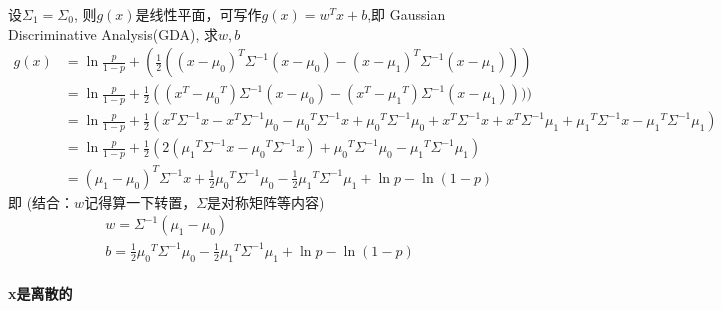 \documentclass[UTF8]{ctexart}
\begin{document}
设$ \Sigma_1=\Sigma_0 $, 则$g(x)$是线性平面，可写作$g(x) = w^Tx+b$,即 Gaussian Discriminative Analysis(GDA),
求$w, b$
\begin{equation*}
    \begin{aligned}
        g(x) &= \ln{\frac{p}{1-p}} + (\frac{1}{2}((x-\mu_0)^T\Sigma^{-1}(x-\mu_0)-(x-\mu_1)^T\Sigma^{-1}(x-\mu_1))) \\
        & = \ln{\frac{p}{1-p}} + \frac{1}{2}((x^T-{\mu_0}^T)\Sigma^{-1}(x-\mu_0) - (x^T-{\mu_1}^T)\Sigma^{-1}(x-\mu_1))))\\
        &= \ln{\frac{p}{1-p}} + \frac{1}{2}(x^T \Sigma^{-1}x - x^T\Sigma^{-1}\mu_0 - {\mu_0}^T\Sigma^{-1}x + {\mu_0}^T\Sigma^{-1}\mu_0 + x^T \Sigma^{-1}x + x^T\Sigma^{-1}\mu_1 + {\mu_1}^T\Sigma^{-1}x - {\mu_1}^T\Sigma^{-1}\mu_1) \\
        &= \ln{\frac{p}{1-p}} + \frac{1}{2}(2({\mu_1}^T \Sigma^{-1}x - {\mu_0}^T \Sigma^{-1}x) + {\mu_0}^T\Sigma^{-1}\mu_0 - {\mu_1}^T\Sigma^{-1}\mu_1) \\
        &= ({{\mu_1}-{\mu_0}})^T\Sigma^{-1}x + \frac{1}{2}{\mu_0}^T\Sigma^{-1}\mu_0 - \frac{1}{2}{\mu_1}^T\Sigma^{-1}\mu_1 + \ln p - \ln{(1-p)} 
    \end{aligned}
\end{equation*}
即 (结合：$w$记得算一下转置，$\Sigma$是对称矩阵等内容)
\begin{gather*}
    w = \Sigma^{-1}({{\mu_1}-{\mu_0}})\\
    b = \frac{1}{2}{\mu_0}^T\Sigma^{-1}\mu_0 - \frac{1}{2}{\mu_1}^T\Sigma^{-1}\mu_1 + \ln p - \ln{(1-p)}  
\end{gather*}

\paragraph*{x是离散的}
\end{document}
